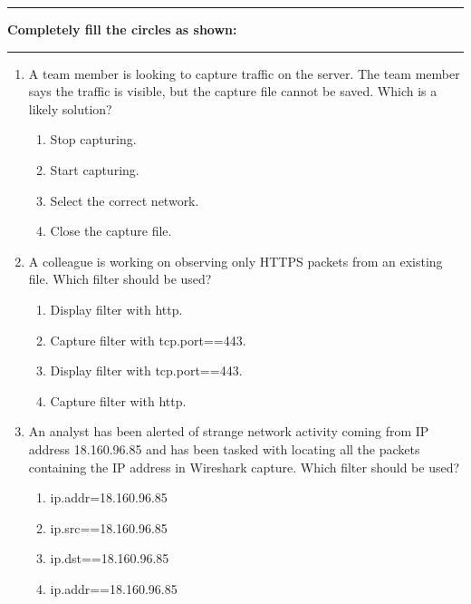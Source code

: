 \documentclass{article}
\newcommand{\incorrectOption}{\item[\textbf{\Circle}]}
\begin{document}


\begin{center}
\rule{\textwidth}{0.4pt}
\textbf{Completely fill the circles as shown: \Circle \Circle \CIRCLE \Circle}
\rule{\textwidth}{0.4pt}
\end{center}


\begin{enumerate}[leftmargin=*, label=\textbf{Q\arabic*}, itemsep=-5pt]
\item A team member is looking to capture traffic on the server. The
  team member says the traffic is visible, but the capture file cannot
  be saved. Which is a likely solution? 
  \begin{enumerate}[itemsep=-3.5pt, label={}]
  \incorrectOption Stop capturing.
  \incorrectOption Start capturing.
  \incorrectOption Select the correct network.
  \incorrectOption Close the capture file.
  \end{enumerate}  
 
\item A colleague is working on observing only HTTPS packets from an
  existing file. Which filter should be used?  
  \begin{enumerate}[itemsep=-3.5pt, label={}]
  \incorrectOption Display filter with {http}.
  \incorrectOption Capture filter with {tcp.port==443}.
  \incorrectOption Display filter with {tcp.port==443}.
  \incorrectOption Capture filter with {http}.
  \end{enumerate}
 
\item An analyst has been alerted of strange network activity coming
  from IP address 18.160.96.85 and has been tasked with locating all
  the packets containing the IP address in Wireshark capture. Which
  filter should be used?  
  \begin{enumerate}[itemsep=-3.5pt, label={}]
  \incorrectOption ip.addr=18.160.96.85
  \incorrectOption ip.src==18.160.96.85
  \incorrectOption ip.dst==18.160.96.85
  \incorrectOption ip.addr==18.160.96.85
\end{enumerate}
\end{enumerate}
\end{document}
